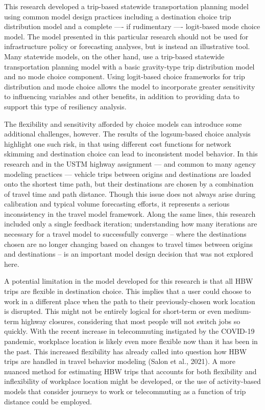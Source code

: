 \documentclass[
  letterpaper,
  number,
  review,
  3p]{elsarticle}
\begin{document}
This research developed a trip-based statewide transportation planning
model using common model design practices including a destination choice
trip distribution model and a complete ---- if rudimentary ----
logit-based mode choice model. The model presented in this particular
research should not be used for infrastructure policy or forecasting
analyses, but is instead an illustrative tool. Many statewide models, on
the other hand, use a trip-based statewide transportation planning model
with a basic gravity-type trip distribution model and no mode choice
component. Using logit-based choice frameworks for trip distribution and
mode choice allows the model to incorporate greater sensitivity to
influencing variables and other benefits, in addition to providing data
to support this type of resiliency analysis.

The flexibility and sensitivity afforded by choice models can introduce
some additional challenges, however. The results of the logsum-based
choice analysis highlight one such risk, in that using different cost
functions for network skimming and destination choice can lead to
inconsistent model behavior. In this research and in the USTM highway
assignment --- and common to many agency modeling practices --- vehicle
trips between origins and destinations are loaded onto the shortest time
path, but their destinations are chosen by a combination of travel time
and path distance. Though this issue does not always arise during
calibration and typical volume forecasting efforts, it represents a
serious inconsistency in the travel model framework. Along the same
lines, this research included only a single feedback iteration;
understanding how many iterations are necessary for a travel model to
successfully converge -- where the destinations chosen are no longer
changing based on changes to travel times between origins and
destinations -- is an important model design decision that was not
explored here.

A potential limitation in the model developed for this research is that
all HBW trips are flexible in destination choice. This implies that a
user could choose to work in a different place when the path to their
previously-chosen work location is disrupted. This might not be entirely
logical for short-term or even medium-term highway closures, considering
that most people will not switch jobs so quickly. With the recent
increase in telecommuting instigated by the COVID-19 pandemic, workplace
location is likely even more flexible now than it has been in the past.
This increased flexibility has already called into question how HBW
trips are handled in travel behavior modeling (Salon et al., 2021). A
more nuanced method for estimating HBW trips that accounts for both
flexibility and inflexibility of workplace location might be developed,
or the use of activity-based models that consider journeys to work or
telecommuting as a function of trip distance could be employed.
\end{document}
